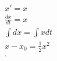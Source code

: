 \documentclass[a4paper,10pt]{article}
\title{}
\author{}
\begin{document}
\begin{align}
    x' = x \\ 
    \frac{dx}{dt} = x \\
    \int dx = \int xdt \\
    x - x_0 = \frac{1}{2} x^2 \\ 
    .\\    
\end{align}
\end{document}
